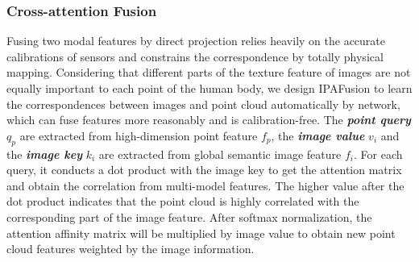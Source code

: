 \documentclass[letterpaper]{article} %
\begin{document}
\subsubsection{Cross-attention Fusion}
 Fusing two modal features by direct projection relies heavily on the accurate calibrations of sensors and constrains the correspondence by totally physical mapping. Considering that different parts of the texture feature of images are not equally important to each point of the human body, we design IPAFusion to learn the correspondences between images and point cloud automatically by network, which can fuse features more reasonably and is calibration-free. The \textbf{\emph{point query}} $q_p$ are extracted from high-dimension point feature $f_p$, the \textbf{\emph{image value}} $v_i$ and the \textbf{\emph{image key}} $k_i$ are extracted from global semantic image feature $f_i$. For each query, it conducts a dot product with the image key to get the attention matrix and obtain the correlation from multi-model features. The higher value after the dot product indicates that the point cloud is highly correlated with the corresponding part of the image feature. After softmax normalization, the attention affinity matrix will be multiplied by image value to obtain new point cloud features weighted by the image information.
\end{document}
